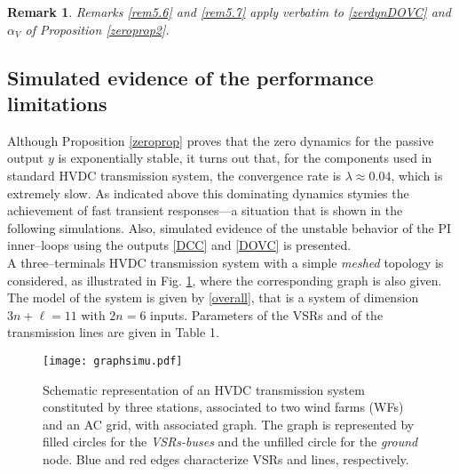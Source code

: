 \documentclass[5p,twocolumn]{elsarticle}
\def\begrem{\begin{remark}\rm}
\def\endrem{\end{remark}}
\newtheorem{remark}[theorem]{Remark}
\numberwithin{equation}{section}
\begin{document}
\begrem
Remarks \ref{rem5.6} and \ref{rem5.7} apply \textit{verbatim} to \eqref{zerdynDOVC} and $\alpha_V$ of Proposition \ref{zeroprop2}.
\endrem

\subsection{Simulated evidence of the performance limitations}
\label{simuinner}
Although Proposition \ref{zeroprop} proves that the zero dynamics for the passive output $y$ is exponentially stable, it turns out that, for the components used in standard HVDC transmission system, the convergence rate is $\lambda \approx 0.04$, which is extremely slow. As indicated above this dominating dynamics stymies the achievement of fast transient responses---a situation that is shown in the following simulations. Also, simulated evidence of the unstable behavior of the PI inner--loops using the outputs  \eqref{DCC} and \eqref{DOVC} is presented.\\
A three--terminals HVDC transmission system with a simple \textit{meshed} topology is considered, as illustrated in Fig. \ref{tops}, where the corresponding graph is also given. The model of the system is given by \eqref{overall}, that is a system of dimension $3n+\ell=11$ with $2n=6$ inputs. Parameters of the VSRs and of the transmission lines are given in Table 1.

\begin{figure}[h!]
 \centering
\texttt{[image: graphsimu.pdf]}
\caption{{Schematic representation of an HVDC transmission system constituted by three stations, associated to two wind farms (WFs) and an AC grid, with associated graph. The graph is represented by filled circles for the \textit{VSRs-buses} and the unfilled circle for the \textit{ground} node. Blue and red edges characterize VSRs and lines, respectively.}}
 \label{tops}
\end{figure}
\end{document}
